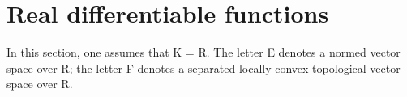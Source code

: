 \section{Real differentiable functions}

In this section, one assumes that K = R. The letter E denotes a normed vector space over R; the letter F denotes a separated locally convex topological vector space over R.

